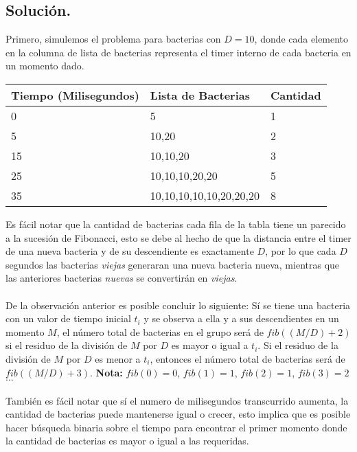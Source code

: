 \documentclass[12pt,letterpaper,titlepage]{article}
\begin{document}
\subsection{Solución.}
Primero, simulemos el problema para bacterias con $D = 10$, donde cada elemento en la columna de lista de bacterias representa el timer interno de cada bacteria en un momento dado.
\begin{table}[H]
	\centering
	\begin{tabular}{|l|l|l|}
		\hline
		Tiempo (Milisegundos) & Lista de Bacterias      & Cantidad \\ \hline
		0                     & 5                       & 1        \\ \hline
		5                     & 10,20                   & 2        \\ \hline
		15                    & 10,10,20                & 3        \\ \hline
		25                    & 10,10,10,20,20          & 5        \\ \hline
		35                    & 10,10,10,10,10,20,20,20 & 8        \\ \hline
	\end{tabular}
\end{table}
Es fácil notar que la cantidad de bacterias cada fila de la tabla tiene un parecido a la sucesión de Fibonacci, esto se debe al hecho de que la distancia entre el timer de una nueva bacteria y de su descendiente es exactamente $D$, por lo que cada $D$ segundos las bacterias \textit{viejas} generaran una nueva bacteria nueva, mientras que las anteriores bacterias \textit{nuevas} se convertirán en \textit{viejas}.
\\~\\
De la observación anterior es posible concluir lo siguiente: Sí se tiene una bacteria con un valor de tiempo inicial $t_{i}$ y se observa a ella y a sus descendientes en un momento $M$, el número total de bacterias en el grupo será de $fib((M/D)+2)$ si el residuo de la división de $M$ por $D$ es mayor o igual a $t_{i}$. Si el residuo de la división de $M$ por $D$ es menor a $t_{i}$, entonces el número total de bacterias será de $fib((M/D)+3)$. \textbf{Nota:} $fib(0) = 0$, $fib(1) = 1$, $fib(2) = 1$, $fib(3) = 2$ $...$ 
\\~\\
También es fácil notar que sí el numero de milisegundos transcurrido aumenta, la cantidad de bacterias puede mantenerse igual o crecer, esto implica que es posible hacer búsqueda binaria sobre el tiempo para encontrar el primer momento donde la cantidad de bacterias es mayor o igual a las requeridas.
\end{document}
